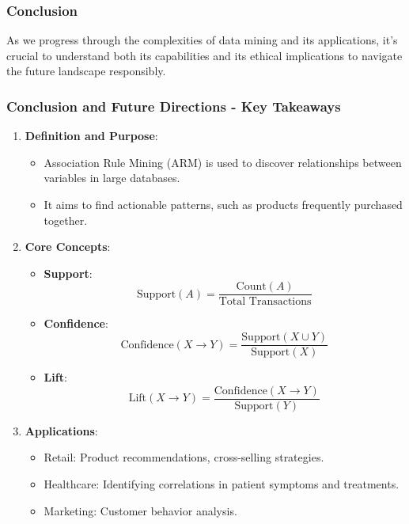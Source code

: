 \documentclass[aspectratio=169]{beamer}
\begin{document}
\begin{frame}[fragile]
  \frametitle{Conclusion}

  As we progress through the complexities of data mining and its applications, it's crucial to understand both its capabilities and its ethical implications to navigate the future landscape responsibly.

\end{frame}

\begin{frame}[fragile]
    \frametitle{Conclusion and Future Directions - Key Takeaways}
    \begin{enumerate}
        \item \textbf{Definition and Purpose}:
            \begin{itemize}
                \item Association Rule Mining (ARM) is used to discover relationships between variables in large databases.
                \item It aims to find actionable patterns, such as products frequently purchased together.
            \end{itemize}
        
        \item \textbf{Core Concepts}:
            \begin{itemize}
                \item \textbf{Support}:
                    \begin{equation}
                    \text{Support}(A) = \frac{\text{Count}(A)}{\text{Total Transactions}}
                    \end{equation}
                \item \textbf{Confidence}:
                    \begin{equation}
                    \text{Confidence}(X \rightarrow Y) = \frac{\text{Support}(X \cup Y)}{\text{Support}(X)}
                    \end{equation}
                \item \textbf{Lift}:
                    \begin{equation}
                    \text{Lift}(X \rightarrow Y) = \frac{\text{Confidence}(X \rightarrow Y)}{\text{Support}(Y)}
                    \end{equation}
            \end{itemize}
        
        \item \textbf{Applications}:
            \begin{itemize}
                \item Retail: Product recommendations, cross-selling strategies.
                \item Healthcare: Identifying correlations in patient symptoms and treatments.
                \item Marketing: Customer behavior analysis.
            \end{itemize}
    \end{enumerate}
\end{frame}
\end{document}
